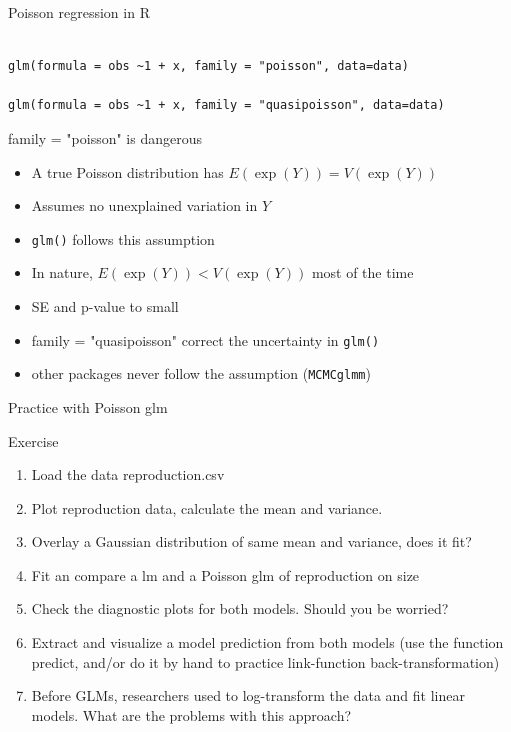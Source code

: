 \documentclass[10pt]{beamer}
\makeatletter
\newenvironment{kframe}{%
 \def\at@end@of@kframe{}%
 \ifinner\ifhmode%
  \def\at@end@of@kframe{\end{minipage}}%
  \begin{minipage}{\columnwidth}%
 \fi\fi%
 \def\FrameCommand##1{\hskip\@totalleftmargin \hskip-\fboxsep
 \colorbox{shadecolor}{##1}\hskip-\fboxsep
     \hskip-\linewidth \hskip-\@totalleftmargin \hskip\columnwidth}%
 \MakeFramed {\advance\hsize-\width
   \@totalleftmargin\z@ \linewidth\hsize
   \@setminipage}}%
 {\par\unskip\endMakeFramed%
 \at@end@of@kframe}
\newenvironment{knitrout}{}{} %
\makeatother
\begin{document}
  
\begin{frame}[fragile]{Poisson regression in R}
    
\begin{knitrout}
\color{fgcolor}\begin{kframe}
\begin{verbatim}

glm(formula = obs ~1 + x, family = "poisson", data=data)

glm(formula = obs ~1 + x, family = "quasipoisson", data=data)
\end{verbatim}
\end{kframe}
\end{knitrout}

\begin{alertblock}{family = "poisson" is dangerous}
 \begin{itemize}
  \item A true Poisson distribution has $E(\exp(Y))=V(\exp(Y))$
  \item Assumes no unexplained variation in $Y$
  \item \texttt{glm()} follows this assumption
  \item In nature,  $E(\exp(Y)) < V(\exp(Y))$ most of the time
  \item SE and p-value to small
  \item family = "quasipoisson" correct the uncertainty in \texttt{glm()}
  \item other packages never follow the assumption (\texttt{MCMCglmm})
 \end{itemize}
\end{alertblock}

\end{frame}

\begin{frame}{Practice with Poisson glm}
 
  \begin{exampleblock}{Exercise}
    \begin{enumerate}
      \item Load the data reproduction.csv
      \item Plot reproduction data, calculate the mean and variance. 
      \item Overlay a Gaussian distribution of same mean and variance, does it fit?
      \item Fit an compare a lm and a Poisson glm of reproduction on size 
      \item Check the diagnostic plots for both models. Should you be worried?
      \item Extract and visualize a model prediction from both models (use the function predict, and/or do it by hand to practice link-function back-transformation)
      \item Before GLMs, researchers used to log-transform the data and fit linear models. What are the problems with this approach?
    \end{enumerate}
  \end{exampleblock}
\end{frame}
\end{document}
